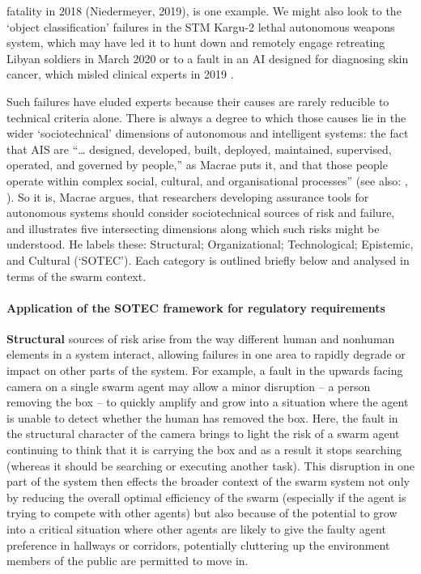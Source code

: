 \documentclass[lettersize,journal]{IEEEtran}
\begin{document}

fatality in 2018 (Niedermeyer, 2019), is one example. We might also look to the `object classification’ failures in the STM Kargu-2 lethal autonomous weapons system, which may have led it to hunt down and remotely engage retreating Libyan soldiers in March 2020 \cite{nasu2021kargu} or to a fault in an AI designed for diagnosing skin cancer, which misled clinical experts in 2019 \cite{tschandl2020human}.

Such failures have eluded experts because their causes are rarely reducible to technical criteria alone. There is always a degree to which those causes lie in the wider `sociotechnical’ dimensions of autonomous and intelligent systems: the fact that AIS are ``… designed, developed, built, deployed, maintained, supervised, operated, and governed by people,” as Macrae \cite{macrae2021learning} puts it, and that those people operate within complex social, cultural, and organisational processes” (see also: \cite{pettersen2021organizational}, \cite{reason2016managing}). So it is, Macrae \cite{macrae2021learning} argues, that researchers developing assurance tools for autonomous systems should consider sociotechnical sources of risk and failure, and illustrates five intersecting dimensions along which such risks might be understood. He labels these: Structural; Organizational; Technological; Epistemic, and Cultural (‘SOTEC’). Each category is outlined briefly below and  analysed in terms of the swarm context.

\paragraph*{Application of the SOTEC framework for regulatory requirements}
\textbf{Structural} sources of risk arise from the way different human and nonhuman elements in a system interact, allowing failures in one area to rapidly degrade or impact on other parts of the system. For example, a fault in the upwards facing camera on a single swarm agent may allow a minor disruption – a person removing the box – to quickly amplify and grow into a situation where the agent is unable to detect whether the human has removed the box. Here, the fault in the structural character of the camera brings to light the risk of a swarm agent continuing to think that it is carrying the box and as a result it stops searching (whereas it should be searching or executing another task). This disruption in one part of the system then effects the broader context of the swarm system not only by reducing the overall optimal efficiency of the swarm (especially if the agent is trying to compete with other agents) but also because of the potential to grow into a critical situation where other agents are likely to give the faulty agent preference in hallways or corridors, potentially cluttering up the environment members of the public are permitted to move in. 
\end{document}
